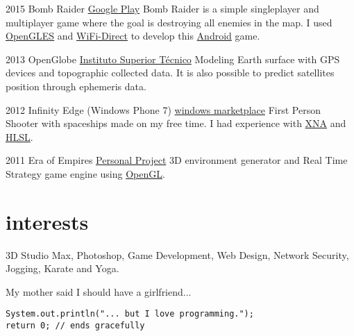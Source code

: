 \documentclass[]{friggeri-cv}
\begin{document}
\begin{entrylist}
  \entry
    {2015}
    {Bomb Raider}
    {\href{http://play.google.com/store/apps/details?id=pt.ist.bombraider}{Google Play}}
    {Bomb Raider is a simple singleplayer and multiplayer game where the goal is destroying all enemies in the map. I used \underline{OpenGLES} and \underline{WiFi-Direct} to develop this \underline{Android} game.}

  \entry
    {2013}
    {OpenGlobe}
    {\href{http://web.ist.utl.pt/ist168621/?page=10}{Instituto Superior Técnico}}
    {Modeling Earth surface with GPS devices and topographic collected data. It is also possible to predict satellites position through ephemeris data.}

  \entry
    {2012}
    {Infinity Edge (Windows Phone 7)}
    {\href{http://www.windowsphone.com/en-us/store/app/infinity-edge/05516463-3a89-4351-996e-62e5b4519aeb}{windows marketplace}}
    {First Person Shooter with spaceships made on my free time. I had experience with \underline{XNA} and \underline{HLSL}.}

  \entry
    {2011}
    {Era of Empires}
    {\href{http://web.ist.utl.pt/ist168621/?page=8}{Personal Project}}
    {3D environment generator and Real Time Strategy game engine using \underline{OpenGL}.}


\end{entrylist}

\section{interests}
    3D Studio Max, Photoshop, Game Development, Web Design, Network Security, Jogging, Karate and Yoga.

	My mother said I should have a girlfriend...
	
%
%


\begin{lstlisting}
System.out.println("... but I love programming.");
return 0; // ends gracefully
\end{lstlisting}
\end{document}
